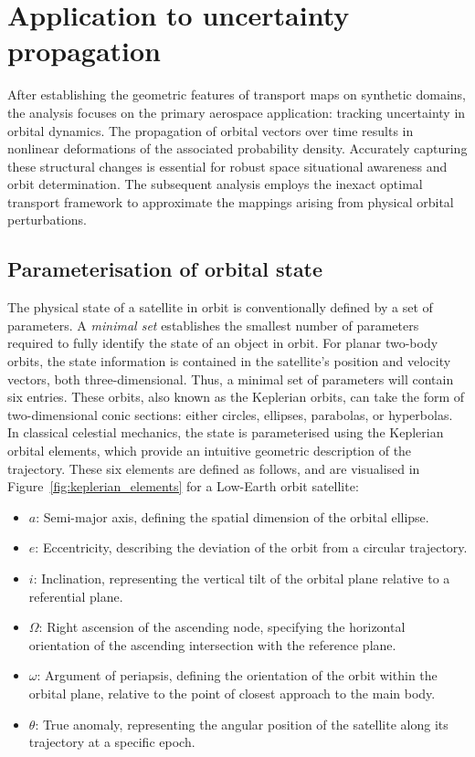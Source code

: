 \clearpage

\section{Application to uncertainty propagation} \label{sec:aerospace_uncertainty}

After establishing the geometric features of transport maps on synthetic domains, the analysis focuses on the primary aerospace application: tracking uncertainty in orbital dynamics. The propagation of orbital vectors over time results in nonlinear deformations of the associated probability density. Accurately capturing these structural changes is essential for robust space situational awareness and orbit determination. The subsequent analysis employs the inexact optimal transport framework to approximate the mappings arising from physical orbital perturbations.

\subsection{Parameterisation of orbital state} \label{subsec:orbital_state}

The physical state of a satellite in orbit is conventionally defined by a set of parameters. A \emph{minimal set} establishes the smallest number of parameters required to fully identify the state of an object in orbit. For planar two-body orbits, the state information is contained in the satellite's position and velocity vectors, both three-dimensional. Thus, a minimal set of parameters will contain six entries. These orbits, also known as the Keplerian orbits, can take the form of two-dimensional conic sections: either circles, ellipses, parabolas, or hyperbolas. In classical celestial mechanics, the state is parameterised using the Keplerian orbital elements, which provide an intuitive geometric description of the trajectory. These six elements are defined as follows, and are visualised in Figure~\ref{fig:keplerian_elements} for a Low-Earth orbit satellite:
\begin{itemize}
    \item $a$: Semi-major axis, defining the spatial dimension of the orbital ellipse.
    \item $e$: Eccentricity, describing the deviation of the orbit from a circular trajectory.
    \item $i$: Inclination, representing the vertical tilt of the orbital plane relative to a referential plane.
    \item $\Omega$: Right ascension of the ascending node, specifying the horizontal orientation of the ascending intersection with the reference plane.
    \item $\omega$: Argument of periapsis, defining the orientation of the orbit within the orbital plane, relative to the point of closest approach to the main body.
    \item $\theta$: True anomaly, representing the angular position of the satellite along its trajectory at a specific epoch.
\end{itemize}

